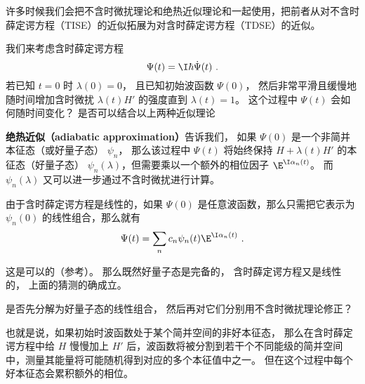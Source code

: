

许多时候我们会把不含时微扰理论和绝热近似理论和一起使用，把前者从对不含时薛定谔方程（TISE）的近似拓展为对含时薛定谔方程（TDSE）的近似。

我们来考虑含时薛定谔方程
\begin{equation}
[H + \lambda(t)H']\Psi(t) = \I\hbar\dot \Psi(t)~.
\end{equation}
若已知 $t=0$ 时 $\lambda(0) = 0$， 且已知初始波函数 $\Psi(0)$， 然后非常平滑且缓慢地随时间增加含时微扰 $\lambda(t) H'$ 的强度直到 $\lambda(t)=1$。 这个过程中 $\Psi(t)$ 会如何随时间变化？ 是否可以结合以上两种近似理论



\textbf{绝热近似（adiabatic approximation）}告诉我们， 如果 $\Psi(0)$ 是一个非简并本征态（或好量子态） $\psi_n$， 那么该过程中 $\Psi(t)$ 将始终保持 $H+\lambda(t) H'$ 的本征态（好量子态） $\psi_n(\lambda)$，但需要乘以一个额外的相位因子 $\E^{\I\alpha_n(t)}$。 而 $\psi_n(\lambda)$ 又可以进一步通过不含时微扰进行计算。

由于含时薛定谔方程是线性的，如果 $\Psi(0)$ 是任意波函数，那么只需把它表示为 $\psi_n(0)$ 的线性组合，那么就有
\begin{equation}
\Psi(t) = \sum_n c_n \psi_n(t) \E^{\I\alpha_n(t)}~.
\end{equation}


这是可以的（参考\cite{GriffQ}）。 那么既然好量子态是完备的， 含时薛定谔方程又是线性的， 上面的猜测的确成立。

是否先分解为好量子态的线性组合， 然后再对它们分别用不含时微扰理论修正？

也就是说，如果初始时波函数处于某个简并空间的非好本征态， 那么在含时薛定谔方程中给 $H$ 慢慢加上 $H'$ 后，波函数将被分割到若干个不同能级的简并空间中，测量其能量将可能随机得到对应的多个本征值中之一。 但在这个过程中每个好本征态会累积额外的相位。
